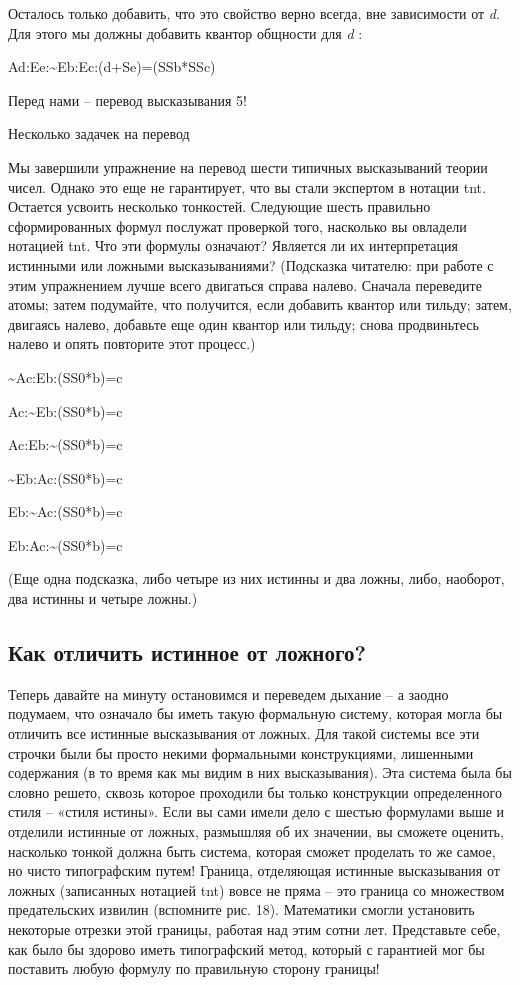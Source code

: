 \documentclass[../main.tex]{subfiles}
\begin{document}
Осталось только добавить, что это свойство верно всегда, вне зависимости от \emph{d}. Для этого мы должны добавить квантор общности для \emph{d} :

Ad:Ee:\textasciitilde Eb:Ec:(d+Se)=(SSb*SSc)

Перед нами \--- перевод высказывания 5!

Несколько задачек на перевод

Мы завершили упражнение на перевод шести типичных высказываний теории чисел. Однако это еще не гарантирует, что вы стали экспертом в нотации \acs{tnt}. Остается усвоить несколько тонкостей. Следующие шесть правильно сформированных формул послужат проверкой того, насколько вы овладели нотацией \acs{tnt}. Что эти формулы означают? Является ли их интерпретация истинными или ложными высказываниями? (Подсказка читателю: при работе с этим упражнением лучше всего двигаться справа налево. Сначала переведите атомы; затем подумайте, что получится, если добавить квантор или тильду; затем, двигаясь налево, добавьте еще один квантор или тильду; снова продвиньтесь налево и опять повторите этот процесс.)

\textasciitilde Ac:Eb:(SS0*b)=c

Ac:\textasciitilde Eb:(SS0*b)=c

Ac:Eb:\textasciitilde(SS0*b)=c

\textasciitilde Eb:Ac:(SS0*b)=c

Eb:\textasciitilde Ac:(SS0*b)=c

Eb:Ac:\textasciitilde(SS0*b)=c

(Еще одна подсказка, либо четыре из них истинны и два ложны, либо, наоборот, два истинны и четыре ложны.)


\subsection{Как отличить истинное от ложного?}

Теперь давайте на минуту остановимся и переведем дыхание \--- а заодно подумаем, что означало бы иметь такую формальную систему, которая могла бы отличить все истинные высказывания от ложных. Для такой системы все эти строчки были бы просто некими формальными конструкциями, лишенными содержания (в то время как мы видим в них высказывания). Эта система была бы словно решето, сквозь которое проходили бы только конструкции определенного стиля \--- «стиля истины». Если вы сами имели дело с шестью формулами выше и отделили истинные от ложных, размышляя об их значении, вы сможете оценить, насколько тонкой должна быть система, которая сможет проделать то же самое, но чисто типографским путем! Граница, отделяющая истинные высказывания от ложных (записанных нотацией \acs{tnt}) вовсе не пряма \--- это граница со множеством предательских извилин (вспомните рис. 18). Математики смогли установить некоторые отрезки этой границы, работая над этим сотни лет. Представьте себе, как было бы здорово иметь типографский метод, который с гарантией мог бы поставить любую формулу по правильную сторону границы!
\end{document}
